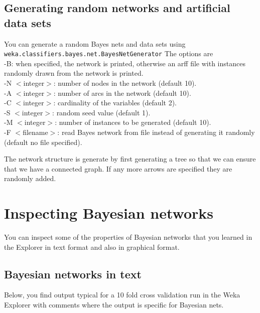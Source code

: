 \documentclass{article}
\begin{document}
\subsection*{Generating random networks and artificial data sets}
You can generate a random Bayes nets and data sets
 using {\tt weka.classifiers.bayes.net.BayesNetGenerator}
 The options are\\
-B: when specified, the network is printed, otherwise an arff file with
instances randomly drawn from the network is printed.\\
-N $<$integer$>$: number of nodes in the network (default 10).\\
-A $<$integer$>$: number of arcs in the network (default 10).\\
-C $<$integer$>$: cardinality of the variables (default 2).\\
-S $<$integer$>$: random seed value (default 1).\\
-M $<$integer$>$: number of instances to be generated (default 10).\\
-F $<$filename$>$: read Bayes network from file instead of generating it randomly (default no file specified).

The network structure is generate by first generating a tree so that we can
ensure that we have a connected graph. If any more arrows are specified they are
randomly added.


\section{Inspecting Bayesian networks}

You can inspect some of the properties of Bayesian networks that you learned
in the Explorer in text format and also in graphical format.
  
\subsection*{Bayesian networks in text}

Below, you find output typical for a 10 fold cross validation run in the Weka
Explorer with comments where the output is specific for Bayesian nets. 
\end{document}
